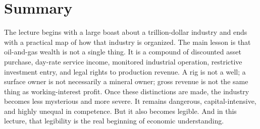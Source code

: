 \section{Summary}

The lecture begins with a large boast about a trillion-dollar industry and ends with a practical map of how that industry is organized. The main lesson is that oil-and-gas wealth is not a single thing. It is a compound of discounted asset purchase, day-rate service income, monitored industrial operation, restrictive investment entry, and legal rights to production revenue. A rig is not a well; a surface owner is not necessarily a mineral owner; gross revenue is not the same thing as working-interest profit. Once these distinctions are made, the industry becomes less mysterious and more severe. It remains dangerous, capital-intensive, and highly unequal in competence. But it also becomes legible. And in this lecture, that legibility is the real beginning of economic understanding.